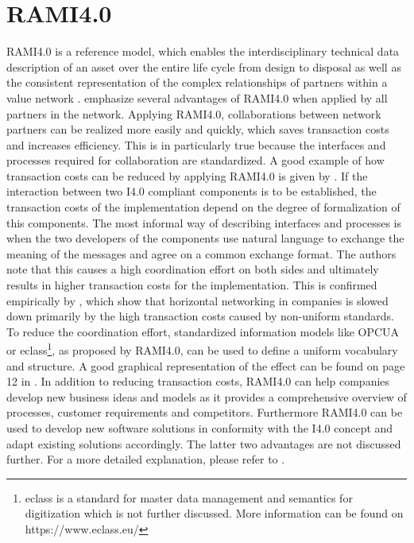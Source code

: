 \section{RAMI4.0}
\ac{RAMI4.0} is a reference model, which enables the interdisciplinary technical data description of an asset over the entire life cycle from design to disposal as well as the consistent representation of the complex relationships of partners within a value network \cite[p. 4]{Heidel2017ReferenzarchitekturmodellIndustrie4.0Komponente}. \citet[p. 23]{Arnold2018DigitaleMittelstand} emphasize several advantages of \ac{RAMI4.0} when applied by all partners in the network. Applying \ac{RAMI4.0}, collaborations between network partners can be realized more easily and quickly, which saves transaction costs and increases efficiency. This is in particularly true because the interfaces and processes required for collaboration are standardized. A good example of how transaction costs can be reduced by applying \ac{RAMI4.0} is given by \citet[p. 11]{Bayha2020DescribingComponents}. If the interaction between two \ac{I4.0} compliant components is to be established, the transaction costs of the implementation depend on the degree of formalization of this components. The most informal way of describing interfaces and processes is when the two developers of the components use natural language to exchange the meaning of the messages and agree on a common exchange format. The authors note that this causes a high coordination effort on both sides and ultimately results in higher transaction costs for the implementation. This is confirmed empirically by \citet[p. 14]{Arnold2018DigitaleMittelstand}, which show that horizontal networking in companies is slowed down primarily by the high transaction costs caused by non-uniform standards. To reduce the coordination effort, standardized information models like \ac{OPCUA} or eclass\footnote{eclass is a standard for master data management and semantics for digitization which is not further discussed. More information can be found on https://www.eclass.eu/}, as proposed by \ac{RAMI4.0}, can be used to define a uniform vocabulary and structure. A good graphical representation of the effect can be found on page 12 in \citet{Bayha2020DescribingComponents}. In addition to reducing transaction costs, \ac{RAMI4.0} can help companies develop new business ideas and models as it provides a comprehensive overview of processes, customer requirements and competitors. Furthermore \ac{RAMI4.0} can be used to develop new software solutions in conformity with the \ac{I4.0} concept and adapt existing solutions accordingly. The latter two advantages are not discussed further. For a more detailed explanation, please refer to \citet[p. 24 ff]{Arnold2018DigitaleMittelstand}.

